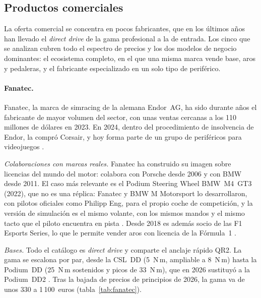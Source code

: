 \subsection{Productos comerciales}
\label{sec:soluciones-comerciales}

La oferta comercial se concentra en pocos fabricantes, que en los últimos años han llevado el \textit{direct drive} de la gama profesional a la de entrada. Los cinco que se analizan cubren todo el espectro de precios y los dos modelos de negocio dominantes: el ecosistema completo, en el que una misma marca vende base, aros y pedaleras, y el fabricante especializado en un solo tipo de periférico.

\paragraph{Fanatec.}
Fanatec, la marca de simracing de la alemana Endor~AG, ha sido durante años el fabricante de mayor volumen del sector, con unas ventas cercanas a los 110 millones de dólares en 2023. En 2024, dentro del procedimiento de insolvencia de Endor, la compró Corsair, y hoy forma parte de un grupo de periféricos para videojuegos \parencite{businesswire_2024_corsair_fanatec}.

\textit{Colaboraciones con marcas reales.} Fanatec ha construido su imagen sobre licencias del mundo del motor: colabora con Porsche desde 2006 y con BMW desde 2011. El caso más relevante es el Podium Steering Wheel BMW~M4~GT3 (2022), que no es una réplica: Fanatec y BMW M Motorsport lo desarrollaron, con pilotos oficiales como Philipp Eng, para el propio coche de competición, y la versión de simulación es el mismo volante, con los mismos mandos y el mismo tacto que el piloto encuentra en pista \parencite{fanatec_web}. Desde 2018 es además socio de las F1 Esports Series, lo que le permite vender aros con licencia de la Fórmula~1 \parencite{fanatec_web}.

\textit{Bases.} Todo el catálogo es \textit{direct drive} y comparte el anclaje rápido QR2. La gama se escalona por par, desde la CSL~DD (5~N\,m, ampliable a 8~N\,m) hasta la Podium~DD (25~N\,m sostenidos y picos de 33~N\,m), que en 2026 sustituyó a la Podium~DD2 \parencite{fanatec_web}. Tras la bajada de precios de principios de 2026, la gama va de unos 330 a 1\,100~euros (tabla~\ref{tab:fanatec}).

